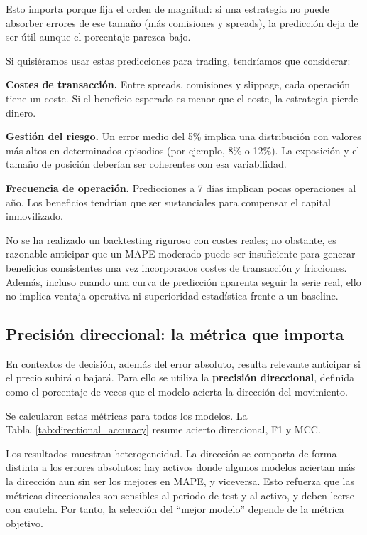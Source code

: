 Esto importa porque fija el orden de magnitud: si una estrategia no puede absorber errores de ese tamaño (más comisiones y spreads), la predicción deja de ser útil aunque el porcentaje parezca bajo.

Si quisiéramos usar estas predicciones para trading, tendríamos que considerar:

\textbf{Costes de transacción.} Entre spreads, comisiones y slippage, cada operación tiene un coste. Si el beneficio esperado es menor que el coste, la estrategia pierde dinero.

\textbf{Gestión del riesgo.} Un error medio del 5\% implica una distribución con valores más altos en determinados episodios (por ejemplo, 8\% o 12\%). La exposición y el tamaño de posición deberían ser coherentes con esa variabilidad.

\textbf{Frecuencia de operación.} Predicciones a 7 días implican pocas operaciones al año. Los beneficios tendrían que ser sustanciales para compensar el capital inmovilizado.

No se ha realizado un backtesting riguroso con costes reales; no obstante, es razonable anticipar que un MAPE moderado puede ser insuficiente para generar beneficios consistentes una vez incorporados costes de transacción y fricciones. Además, incluso cuando una curva de predicción aparenta seguir la serie real, ello no implica ventaja operativa ni superioridad estadística frente a un baseline.

\subsection{Precisión direccional: la métrica que importa}

En contextos de decisión, además del error absoluto, resulta relevante anticipar si el precio subirá o bajará. Para ello se utiliza la \textbf{precisión direccional}, definida como el porcentaje de veces que el modelo acierta la dirección del movimiento.

Se calcularon estas métricas para todos los modelos. La Tabla~\ref{tab:directional_accuracy} resume acierto direccional, F1 y MCC.

\begin{table}[H]
\centering
\caption{Métricas direccionales por modelo y activo}
\label{tab:directional_accuracy}

\end{table}

Los resultados muestran heterogeneidad. La dirección se comporta de forma distinta a los errores absolutos: hay activos donde algunos modelos aciertan más la dirección aun sin ser los mejores en MAPE, y viceversa. Esto refuerza que las métricas direccionales son sensibles al periodo de test y al activo, y deben leerse con cautela. Por tanto, la selección del ``mejor modelo'' depende de la métrica objetivo.

